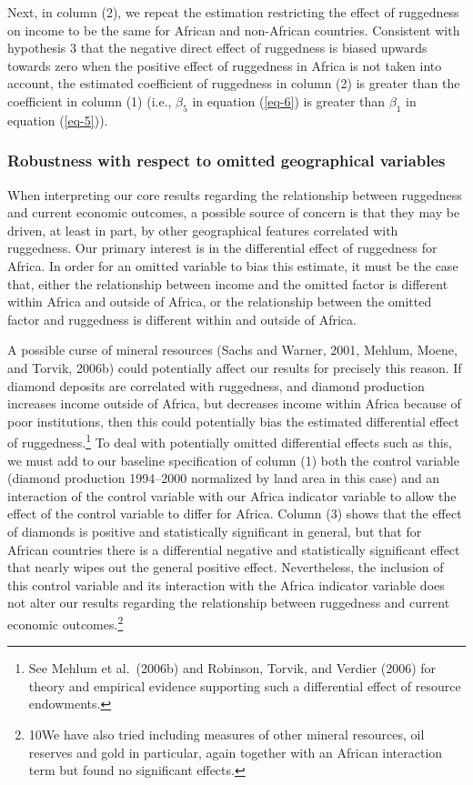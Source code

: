\documentclass[
  letterpaper,
  DIV=11,
  numbers=noendperiod]{scrartcl}
\begin{document}
Next, in column (2), we repeat the estimation restricting the effect of
ruggedness on income to be the same for African and non-African
countries. Consistent with hypothesis 3 that the negative direct effect
of ruggedness is biased upwards towards zero when the positive effect of
ruggedness in Africa is not taken into account, the estimated
coefficient of ruggedness in column (2) is greater than the coefficient
in column (1) (i.e., \(\beta_5\) in equation (\ref{eq-6}) is greater
than \(\beta_1\) in equation (\ref{eq-5})).

\subsubsection{Robustness with respect to omitted geographical
variables}\label{robustness-with-respect-to-omitted-geographical-variables}

When interpreting our core results regarding the relationship between
ruggedness and current economic outcomes, a possible source of concern
is that they may be driven, at least in part, by other geographical
features correlated with ruggedness. Our primary interest is in the
differential effect of ruggedness for Africa. In order for an omitted
variable to bias this estimate, it must be the case that, either the
relationship between income and the omitted factor is different within
Africa and outside of Africa, or the relationship between the omitted
factor and ruggedness is different within and outside of Africa.

A possible curse of mineral resources (Sachs and Warner, 2001, Mehlum,
Moene, and Torvik, 2006b) could potentially affect our results for
precisely this reason. If diamond deposits are correlated with
ruggedness, and diamond production increases income outside of Africa,
but decreases income within Africa because of poor institutions, then
this could potentially bias the estimated differential effect of
ruggedness.\footnote{See Mehlum et al.~(2006b) and Robinson, Torvik, and
  Verdier (2006) for theory and empirical evidence supporting such a
  differential effect of resource endowments.} To deal with potentially
omitted differential effects such as this, we must add to our baseline
specification of column (1) both the control variable (diamond
production 1994--2000 normalized by land area in this case) and an
interaction of the control variable with our Africa indicator variable
to allow the effect of the control variable to differ for Africa. Column
(3) shows that the effect of diamonds is positive and statistically
significant in general, but that for African countries there is a
differential negative and statistically significant effect that nearly
wipes out the general positive effect. Nevertheless, the inclusion of
this control variable and its interaction with the Africa indicator
variable does not alter our results regarding the relationship between
ruggedness and current economic outcomes.\footnote{10We have also tried
  including measures of other mineral resources, oil reserves and gold
  in particular, again together with an African interaction term but
  found no significant effects.}
\end{document}
